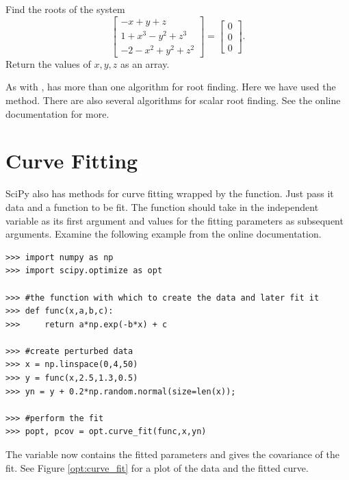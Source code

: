 \begin{problem}
Find the roots of the system
\[
\begin{bmatrix}
	-x+y+z \\
	1+x^3-y^2+z^3\\
	-2-x^2+y^2+z^2
\end{bmatrix} =
\begin{bmatrix}
	0 \\
	0 \\
	0
\end{bmatrix} .
\]
Return the values of $x,y,z$ as an array.
\end{problem}

As with ,  has more than one algorithm for root finding.
Here we have used the  method. 
There are also several algorithms for scalar root finding. See the online documentation for more.

\section*{Curve Fitting} %


SciPy also has methods for curve fitting wrapped by the  function.
Just pass it data and a function to be fit. 
The function should take in the independent variable as its first argument and values for the fitting parameters as subsequent arguments.
Examine the following example from the online documentation.
\begin{lstlisting}
>>> import numpy as np
>>> import scipy.optimize as opt

>>> #the function with which to create the data and later fit it
>>> def func(x,a,b,c):
>>>     return a*np.exp(-b*x) + c

>>> #create perturbed data
>>> x = np.linspace(0,4,50)
>>> y = func(x,2.5,1.3,0.5)
>>> yn = y + 0.2*np.random.normal(size=len(x));

>>> #perform the fit
>>> popt, pcov = opt.curve_fit(func,x,yn)
\end{lstlisting}
The variable  now contains the fitted parameters and  gives the covariance of the fit.
See Figure \ref{opt:curve_fit} for a plot of the data and the fitted curve.

